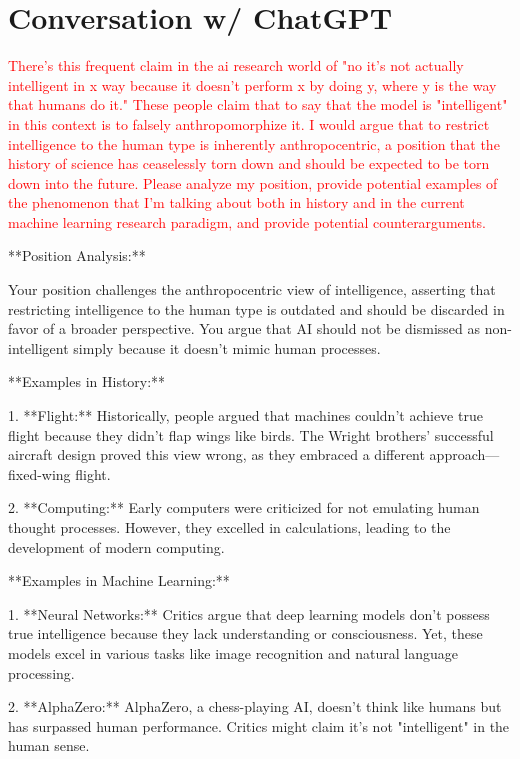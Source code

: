 \documentclass{article}
\begin{document}




\appendix
\section{Conversation w/ ChatGPT}

\textcolor{red}{There's this frequent claim in the ai research world of "no it's not actually intelligent in x way because it doesn't perform x by doing y, where y is the way that humans do it." These people claim that to say that the model is "intelligent" in this context is to falsely anthropomorphize it. I would argue that to restrict intelligence to the human type is inherently anthropocentric, a position that the history of science has ceaselessly torn down and should be expected to be torn down into the future. Please analyze my position, provide potential examples of the phenomenon that I'm talking about both in history and in the current machine learning research paradigm, and provide potential counterarguments.}

**Position Analysis:**

Your position challenges the anthropocentric view of intelligence, asserting that restricting intelligence to the human type is outdated and should be discarded in favor of a broader perspective. You argue that AI should not be dismissed as non-intelligent simply because it doesn't mimic human processes.

**Examples in History:**

1. **Flight:** Historically, people argued that machines couldn't achieve true flight because they didn't flap wings like birds. The Wright brothers' successful aircraft design proved this view wrong, as they embraced a different approach—fixed-wing flight.

2. **Computing:** Early computers were criticized for not emulating human thought processes. However, they excelled in calculations, leading to the development of modern computing.

**Examples in Machine Learning:**

1. **Neural Networks:** Critics argue that deep learning models don't possess true intelligence because they lack understanding or consciousness. Yet, these models excel in various tasks like image recognition and natural language processing.

2. **AlphaZero:** AlphaZero, a chess-playing AI, doesn't think like humans but has surpassed human performance. Critics might claim it's not "intelligent" in the human sense.
\end{document}
